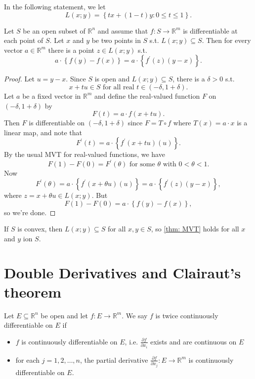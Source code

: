 In the following statement, we let 
\[
    L(x; y) = \left\{ tx + (1 - t)y: 0 \le t \le 1 \right\}. 
\]

\begin{theorem} \label{thm: MVT}
    Let \(S\) be an open subset of \(\mathbb{R} ^n\) and assume that \(f: S \to \mathbb{R} ^m\) is differentiable at each point of \(S\). Let \(x\) and \(y\) be two points in \(S\) s.t. \(L(x;y) \subseteq S\). Then for every vector \(a \in \mathbb{R} ^m\) there is a point \(z \in L(x; y)\) s.t. 
    \[
        a \cdot \left\{ f(y) - f(x) \right\} = a \cdot \left\{ f^{\prime} (z) (y - x) \right\}.  
    \]           
\end{theorem}
\begin{proof}
    Let \(u = y - x\). Since \(S\) is open and \(L(x; y) \subseteq S\), there is a \(\delta > 0\) s.t. 
    \[
        x + tu \in S \text{ for all real } t \in (-\delta , 1+\delta ).
    \]
    Let \(a\) be a fixed vector in \(\mathbb{R} ^m\) and define the real-valued function \(F\) on \((-\delta , 1 + \delta )\) by 
    \[
        F(t) = a \cdot f(x + tu).
    \]
    Then \(F\) is differentiable on \((-\delta , 1 + \delta )\) since \(F = T \circ f\) where \(T(x) = a \cdot x\) is a linear map, and note that 
    \[
        F^{\prime} (t) = a \cdot \left\{ f^{\prime} (x + tu)(u) \right\}. 
    \]            
    By the usual MVT for real-valued functions, we have 
    \[
        F(1) - F(0) = F^{\prime} (\theta ) \text{ for some } \theta \text{ with } 0 < \theta < 1.  
    \]
    Now
    \[
        F^{\prime} (\theta ) = a \cdot \left\{ f^{\prime} (x + \theta u)(u) \right\} = a \cdot \left\{ f^{\prime} (z) (y - x) \right\},  
    \]
    where \(z = x + \theta u \in L(x; y)\). But 
    \[
        F(1) - F(0) = a \cdot \left\{ f(y) - f(x) \right\}, 
    \] 
    so we're done.
\end{proof}

\begin{remark}
    If \(S\) is convex, then \(L(x; y) \subseteq S\) for all \(x, y \in S\), so \autoref{thm: MVT} holds for all \(x\) and \(y\) ion \(S\).       
\end{remark}

\section{Double Derivatives and Clairaut's theorem}
\begin{definition}
    Let \(E \subseteq \mathbb{R} ^n\) be open and let \(f: E \to \mathbb{R} ^m\). We say \(f\) is twice continuously differentiable on \(E\) if 
    \begin{itemize}
        \item [(1)] \(f\) is continuously differentiable on \(E\), i.e. \(\frac{\partial f}{\partial x_i} \) exists and are continuous on \(E\)    
        \item [(2)] for each \(j = 1, 2, \dots , n\), the partial derivative \(\frac{\partial f}{\partial x_j} : E \to \mathbb{R} ^m\) is continuously differentiable on \(E\).  
    \end{itemize}    
\end{definition}

